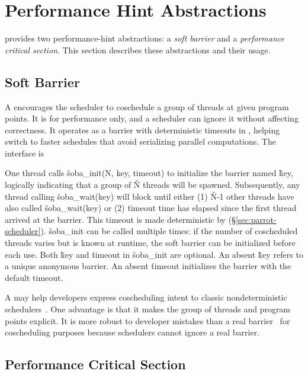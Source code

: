 \section{Performance Hint Abstractions} \label{sec:parrot-hints}

\parrot provides two performance-hint abstractions: a \emph{soft barrier} and
a \emph{performance critical section}.  This section describes these abstractions and
their usage.


\subsection{Soft Barrier} \label{sec:soft-barrier}

A \vcompute encourages the scheduler to coschedule a group of threads at
given program points.  It is for performance only, and a scheduler can
ignore it without affecting correctness.  It operates as a
barrier with deterministic timeouts in \parrot, helping \parrot switch to faster
schedules that avoid serializing parallel computations.  The interface is
\vspace{-3 mm}
\vspace{-1 mm}

\noindent
One thread calls \v{soba\_init(N, key, timeout)} to initialize the barrier
named \v{key}, logically indicating that a group of \v{N} threads will
be spawned.  Subsequently, any thread calling \v{soba\_wait(key)}
will block until either (1) \v{N}-1 other threads have also called
\v{soba\_wait(key)} or (2) \v{timeout} time has elapsed since the first
thread arrived at the barrier.  This timeout is made deterministic by \parrot
(\S\ref{sec:parrot-scheduler}).  \v{soba\_init} can be called multiple
times: if the number of coscheduled threads varies but is known at runtime,
the soft barrier can be initialized before each use.  Both \v{key} and
\v{timeout} in \v{soba\_init} are optional.  An absent \v{key} refers to a
unique anonymous barrier.  An absent \v{timeout} initializes the barrier
with the default timeout.

A \compute may help developers express coscheduling intent to classic
nondeterministic schedulers~\cite{coschedule}.  One advantage is that it
makes the group of threads and program points explicit.  It is more robust
to developer mistakes than a real barrier~\cite{coschedule:sigmetrics96}
for coscheduling purposes because schedulers cannot ignore a real barrier.


\subsection{Performance Critical Section} \label{sec:parrot-performance-critical-section}

